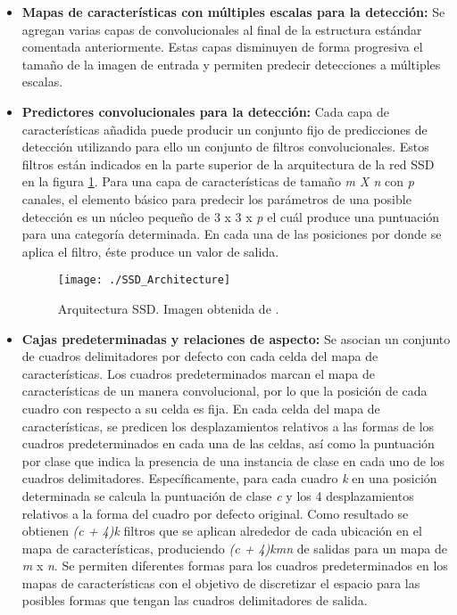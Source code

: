 \documentclass[a4paper, 12pt, oneside]{book}
\begin{document}
\begin{itemize}
\item \textbf{Mapas de características con múltiples escalas para la detección:}  Se agregan varias capas de convolucionales al final de la estructura estándar comentada anteriormente. Estas capas disminuyen de forma progresiva el tamaño de la imagen de entrada y permiten predecir detecciones a múltiples escalas. 
\item \textbf{Predictores convolucionales para la detección:}  Cada capa de características añadida puede producir un conjunto fijo de predicciones de detección utilizando para ello un conjunto de filtros convolucionales. Estos filtros están indicados en la parte superior de la arquitectura de la red SSD en la figura \ref{ArquitecturaSSD}. Para una capa de características de tamaño \textit{m X n} con \textit{p} canales, el elemento básico para predecir los parámetros de una posible detección es un núcleo pequeño de 3 x 3 x \textit{p} el cuál produce una puntuación para una categoría determinada. En cada una de las posiciones por donde se aplica el filtro, éste produce un valor de salida.

\begin{figure}[H]
\begin{center}
\texttt{[image: ./SSD\_Architecture]}
\caption{Arquitectura SSD. Imagen obtenida de \cite{SSD}.}
\label{ArquitecturaSSD}
\end{center}
\end{figure}

\item \textbf{Cajas predeterminadas y relaciones de aspecto:} Se asocian un conjunto de cuadros delimitadores por defecto con cada celda del mapa de características. Los cuadros predeterminados marcan el mapa de características de un manera convolucional, por lo que la posición de cada cuadro con respecto a su celda es fija. En cada celda del mapa de características, se predicen los desplazamientos relativos a las formas de los cuadros predeterminados en cada una de las celdas, así como la puntuación por clase que indica la presencia de una instancia de clase en cada uno de los cuadros delimitadores. Específicamente, para cada cuadro \textit{k} en una posición determinada se calcula la puntuación de clase \textit{c} y los 4 desplazamientos relativos a la forma del cuadro por defecto original. Como resultado se obtienen \textit{(c + 4)k} filtros que se aplican alrededor de cada ubicación en el mapa de características, produciendo \textit{(c + 4)kmn} de salidas para un mapa de \textit{m} x \textit{n}. Se permiten diferentes formas para los cuadros predeterminados en los mapas de características con el objetivo de discretizar el espacio para las posibles formas que tengan las cuadros delimitadores de salida.
\end{itemize}
\end{document}
